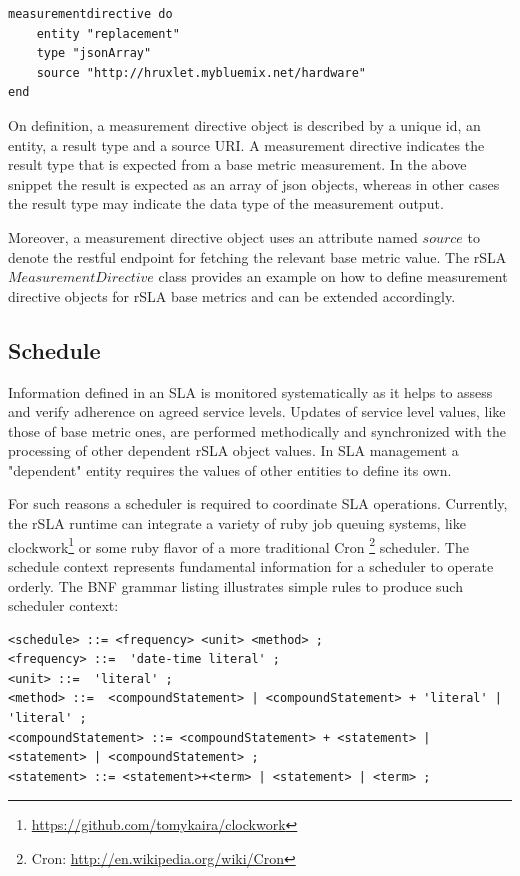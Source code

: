 \documentclass{llncs}
\begin{document}
\begin{lstlisting}[breaklines, firstnumber=auto, caption= rSLA measurementDirective definition, label=MDblst]
measurementdirective do
 	entity "replacement"
 	type "jsonArray"
 	source "http://hruxlet.mybluemix.net/hardware"
end
\end{lstlisting} 

On definition, a measurement directive object is described by a unique id, an entity, a result type and a source URI. A measurement directive indicates the result type that is expected from a base metric measurement. In the above snippet the result is expected as an array of json objects, whereas in other cases the result type may indicate the data type of the measurement output. 

Moreover, a measurement directive object uses an attribute named $source$ to denote the restful endpoint for fetching the relevant base metric value. The rSLA $MeasurementDirective$ class provides an example on how to define measurement directive objects for rSLA base metrics and can be extended accordingly.

\subsection{Schedule}\label{schedule}
Information defined in an SLA is monitored systematically as it helps to assess and verify adherence on agreed service levels. Updates of service level values, like those of base metric ones, are performed methodically and synchronized with the processing of other dependent rSLA object values. In SLA management \cite{ensel} a "dependent" entity requires the values of other entities to define its own.

For such reasons a scheduler is required to coordinate SLA operations. Currently, the rSLA runtime can integrate a variety of ruby job queuing systems, like clockwork\footnote{\url{https://github.com/tomykaira/clockwork}} or some ruby flavor of a more traditional Cron \footnote{Cron: \url{http://en.wikipedia.org/wiki/Cron}} scheduler. The schedule context represents fundamental information for a scheduler to operate orderly. The BNF grammar listing illustrates simple rules to produce such scheduler context:

\begin{lstlisting}[breaklines, firstnumber=auto, caption= $<Schedule>$ BNF grammar, label=Schedlst]
<schedule> ::= <frequency> <unit> <method> ;
<frequency> ::=  'date-time literal' ;
<unit> ::=  'literal' ;
<method> ::=  <compoundStatement> | <compoundStatement> + 'literal' | 'literal' ;
<compoundStatement> ::= <compoundStatement> + <statement> | <statement> | <compoundStatement> ;
<statement> ::= <statement>+<term> | <statement> | <term> ;
\end{lstlisting}
\end{document}
